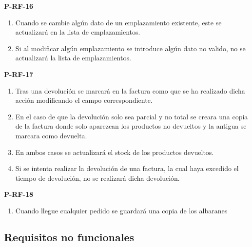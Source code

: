 \textbf{P-RF-16}
\begin{enumerate}
	\item Cuando se cambie algún dato de un emplazamiento existente, este se actualizará en la lista de emplazamientos.
	\item Si al modificar algún emplazamiento se introduce algún dato no valido, no se actualizará la lista de emplazamientos.
\end{enumerate}

\textbf{P-RF-17}
\begin{enumerate}
	\item Tras una devolución se marcará en la factura como que se ha realizado dicha acción modificando el campo correspondiente.
	\item En el caso de que la devolución solo sea parcial y no total se creara una copia de la factura donde solo aparezcan los productos no devueltos y la antigua se marcara como devuelta.
	\item En ambos casos se actualizará el stock de los productos devueltos.
	\item Si se intenta realizar la devolución de una factura, la cual haya excedido el tiempo de devolución, no se realizará dicha devolución.
\end{enumerate}

\textbf{P-RF-18}
\begin{enumerate}
	\item Cuando llegue cualquier pedido se guardará una copia de los albaranes
\end{enumerate}


\subsection{Requisitos no funcionales}

